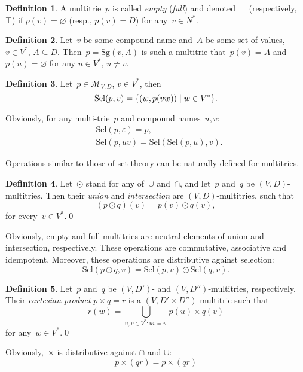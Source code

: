 \documentclass{article}
\theoremstyle{definition}
\newtheorem{Df}{Definition}
\newcommand{\mtempty}{\bot}
\newcommand{\mtfull}{\top}
\newcommand{\set}[1]{\mathcal{#1}}
\newcommand{\setmt}[2]{\set{M}_{#1,#2}}
\newcommand{\select}{\mathrm{Sel}}
\newcommand{\singleleaf}{\mathrm{Sg}}
\begin{document}
\begin{Df}
A multitrie~$p$ is called \emph{empty} (\emph{full}) and denoted~$\mtempty$
(respectively,~$\mtfull$) if $p(v)=\varnothing$ (resp., $p(v)=D$) for any~$v\in
N^\ast$.
\end{Df}

\begin{Df}
Let~$v$ be some compound name and~$A$ be some set of values, $v\in V^\ast$,
$A\subseteq D$.  Then~$p = \singleleaf(v,A)$ is such a multitrie that~$p(v) =
A$ and~$p(u) = \varnothing$ for any $u\in V^\ast$, $u\neq v$.
\end{Df}

\begin{Df}\label{def:select}
Let~$p\in\setmt{V}{D}$, $v\in V^\ast$, then
\[
  \select(p,v) = \{ (w, p(vw)) \mid w\in V^\ast \} .\qedhere
\]
\end{Df}

Obviously, for any multi-trie~$p$ and compound names~$u,v$:
\begin{eqnarray*}
  & \select(p,\varepsilon) = p ,\\
  & \select(p,uv) = \select(\select(p,u), v) .
\end{eqnarray*}

Operations similar to those of set theory can be naturally defined for multitries.

\begin{Df}\label{def:union-intersection}
Let~$\odot$ stand for any of~$\cup$ and~$\cap$, and let~$p$ and~$q$ be
$(V,D)$-multitries. Then their \emph{union} and \emph{intersection} are
$(V,D)$-multitries, such that
\[
  (p\odot q)(v) = p(v) \odot q(v) ,
\]
for every~$v\in V^\ast$.\qed
\end{Df}

Obviously, empty and full multitries are neutral elements of union and intersection,
respectively. These operations are commutative, associative and idempotent.
Moreover, these operations are distributive against selection:
\[
  \select(p\odot q, v) = \select(p, v) \odot \select(q, v) .
\]

\begin{Df}\label{def:cartesian}
Let~$p$ and~$q$ be $(V,D')$- and $(V,D'')$-multitries, respectively. Their
\emph{cartesian product} $p\times q = r$ is a $(V,D'\times D'')$-multitrie
such that
\[
  r(w) = \bigcup_{u,v\in V^\ast: uv = w} p(u) \times q(v)
\]
for any~$w\in V^\ast$.\qed
\end{Df}

Obviously,~$\times$ is distributive against $\cap$ and $\cup$:
\[
  p\times(q\dot r) = p\times(q\dot r)
\]
\end{document}

